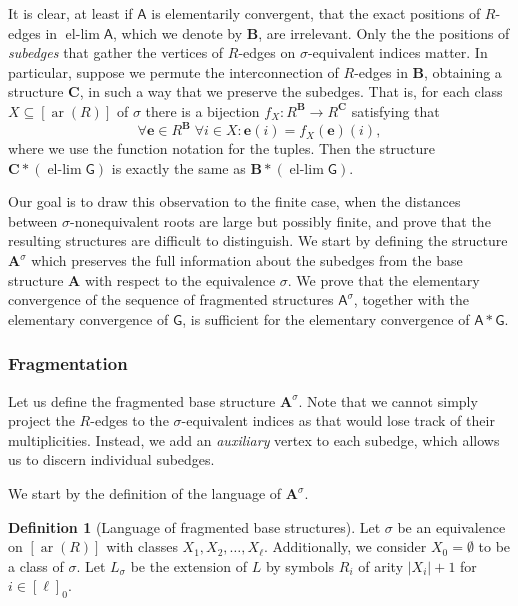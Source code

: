 \documentclass[11pt]{article}
\theoremstyle{plain}
\theoremstyle{definition}
\newtheorem{definition}{Definition}
\theoremstyle{remark}
\DeclareMathOperator\aritysym{ar}
\newcommand{\arity}[1]{{\aritysym({#1})}}
\newcommand{\str}[1]{\mathbf{#1}}
\newcommand{\strseq}[1]{{\boldsymbol{\mathsf{#1}}}}
\newcommand{\tpl}[1]{{\bm{#1}}}
\DeclareMathOperator{\ellim}{el-lim}
\begin{document}
It is clear, at least if $\strseq{A}$ is elementarily convergent, that the exact positions of $R$-edges in $\ellim \strseq{A}$, which we denote by $\str{B}$, are irrelevant.
Only the the positions of \emph{subedges} that gather the vertices of $R$-edges on $\sigma$-equivalent indices matter.
In particular, suppose we permute the interconnection of $R$-edges in $\str{B}$, obtaining a structure $\str{C}$, in such a way that we preserve the subedges.
That is, for each class $X \subseteq [\arity{R}]$ of $\sigma$ there is a bijection $f_X: R^\str{B} \to R^\str{C}$ satisfying that
\[
    \forall \tpl{e} \in R^\str{B}
    \;
    \forall i \in X : \tpl{e}(i) = f_X(\tpl{e})(i)
    ,
\]
where we use the function notation for the tuples.
Then the structure $\str{C} * (\ellim \strseq{G})$ is exactly the same as $\str{B} * (\ellim \strseq{G})$.

Our goal is to draw this observation to the finite case, when the distances between $\sigma$-nonequivalent roots are large but possibly finite, and prove that the resulting structures are difficult to distinguish.
We start by defining the structure $\str{A}^\sigma$ which preserves the full information about the subedges from the base structure $\str{A}$ with respect to the equivalence $\sigma$.
We prove that the elementary convergence of the sequence of fragmented structures $\strseq{A}^\sigma$, together with the elementary convergence of $\strseq{G}$, is sufficient for the elementary convergence of $\strseq{A}*\strseq{G}$.

\subsubsection{Fragmentation}\label{sssec:fragmentation}

Let us define the fragmented base structure $\str{A}^\sigma$.
Note that we cannot simply project the $R$-edges to the $\sigma$-equivalent indices as that would lose track of their multiplicities.
Instead, we add an \emph{auxiliary} vertex to each subedge, which allows us to discern individual subedges.

We start by the definition of the language of $\str{A}^\sigma$.

\begin{definition}[Language of fragmented base structures]
    Let $\sigma$ be an equivalence on $[\arity{R}]$ with classes $X_1, X_2, \dots, X_\ell$.
    Additionally, we consider $X_0 = \emptyset$ to be a class of $\sigma$.
    Let $L_\sigma$ be the extension of $L$ by symbols $R_i$ of arity $|X_i| + 1$ for $i \in [\ell]_0$.
\end{definition}
\end{document}

